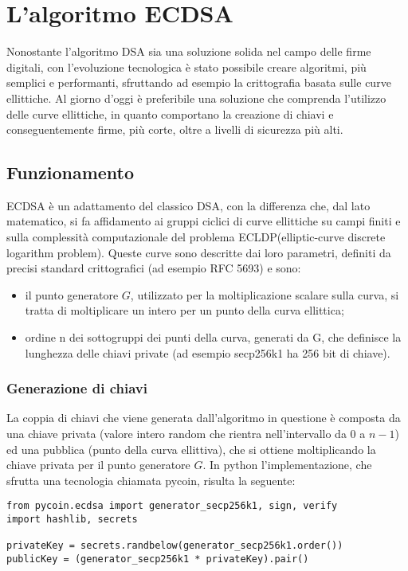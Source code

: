 \chapter{L'algoritmo ECDSA}

Nonostante l'algoritmo DSA sia una soluzione solida nel campo delle firme digitali, con l'evoluzione tecnologica è stato possibile creare algoritmi, più semplici e performanti, sfruttando  ad esempio la crittografia basata sulle curve ellittiche. Al giorno d'oggi è preferibile una soluzione che comprenda l'utilizzo delle curve ellittiche, in quanto comportano la creazione di chiavi e conseguentemente firme, più corte, oltre a livelli di sicurezza più alti.

\section{Funzionamento}

ECDSA è un adattamento del classico DSA, con la differenza che, dal lato matematico, si fa affidamento ai gruppi ciclici di curve ellittiche su campi finiti e sulla complessità computazionale del problema ECLDP(elliptic-curve discrete logarithm problem). Queste curve sono descritte dai loro parametri, definiti da precisi standard crittografici (ad esempio RFC 5693) e sono:
\begin{itemize}
	\item il punto generatore $G$, utilizzato per la moltiplicazione scalare sulla curva, si tratta di moltiplicare un intero per un punto della curva ellittica;
	\item ordine n dei sottogruppi dei punti della curva, generati da G, che definisce la lunghezza delle chiavi private (ad esempio secp256k1 ha 256 bit di chiave).
\end{itemize}

\subsection{Generazione di chiavi}

La coppia di chiavi che viene generata dall'algoritmo in questione è composta da una chiave privata (valore intero random che rientra nell'intervallo da $0$ a $n-1$) ed una pubblica (punto della curva ellittiva), che si ottiene moltiplicando la chiave privata per il punto generatore $G$. 
In python l'implementazione, che sfrutta una tecnologia chiamata pycoin, risulta la seguente:


\begin{lstlisting}
from pycoin.ecdsa import generator_secp256k1, sign, verify
import hashlib, secrets

privateKey = secrets.randbelow(generator_secp256k1.order())
publicKey = (generator_secp256k1 * privateKey).pair()	

\end{lstlisting}

